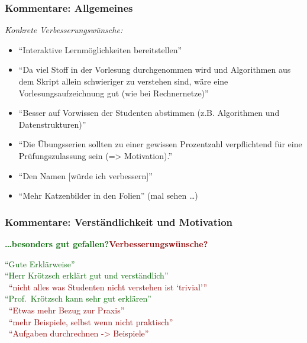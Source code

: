 \documentclass[aspectratio=1610,onlymath]{beamer}
\begin{document}
\maketitle

% 
% 


\newcommand{\praise}[1]{\textcolor{darkgreen}{"`#1"'}}
\newcommand{\critique}[1]{~\hfill\textcolor{darkred}{"`#1"'}}

\begin{frame}\frametitle{Kommentare: Allgemeines}

\bigskip

\emph{Konkrete Verbesserungswünsche:}
\begin{itemize}
\item "`Interaktive Lernmöglichkeiten bereitstellen"'\pause
\item "`Da viel Stoff in der Vorlesung durchgenommen wird und Algorithmen aus dem Skript allein schwieriger zu verstehen sind, wäre eine Vorlesungsaufzeichnung gut (wie bei Rechnernetze)"'\pause
\item "`Besser auf Vorwissen der Studenten abstimmen (z.B. Algorithmen und Datenstrukturen)"'\pause
\item "`Die Übungsserien sollten zu einer gewissen Prozentzahl verpflichtend für eine Prüfungszulassung sein (=> Motivation)."'\pause
\item "`Den Namen [würde ich verbessern]"'\pause
\item "`Mehr Katzenbilder in den Folien"' (mal sehen \ldots)
\end{itemize}

\end{frame}

\begin{frame}\frametitle{Kommentare: Verständlichkeit und Motivation}

\textbf{\textcolor{darkgreen}{\ldots besonders gut gefallen?}}\hfill\textbf{\textcolor{darkred}{Verbesserungswünsche?}}
\bigskip

\praise{Gute Erklärweise}\\[1ex]
\praise{Herr Krötzsch erklärt gut und verständlich}\\[1ex]
\critique{nicht alles was Studenten nicht verstehen ist `trivial'}\\[3ex]
\praise{Prof.\ Krötzsch kann sehr gut erklären}\\[1ex]
\critique{Etwas mehr Bezug zur Praxis}\\[1ex]
\critique{mehr Beispiele, selbst wenn nicht praktisch}\\[1ex]
\critique{Aufgaben durchrechnen -> Beispiele}

\end{frame}
\end{document}
